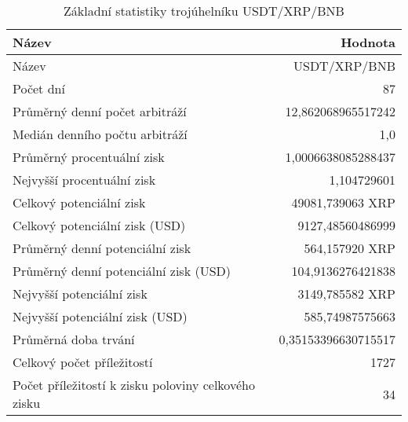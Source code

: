 \begin{table}\centering
\caption{Základní statistiky trojúhelníku USDT/XRP/BNB}
\label{USDTXRPBNB_stats}
\begin{tabular}{|| l | r ||}
\hline Název & Hodnota \\ 
\hline\hline Název & USDT/XRP/BNB \\ 
\hline Počet dní & 87 \\ 
\hline Průměrný denní počet arbitráží & 12,862068965517242 \\ 
\hline Medián denního počtu arbitráží & 1,0 \\ 
\hline Průměrný procentuální zisk & 1,0006638085288437 \\ 
\hline Nejvyšší procentuální zisk & 1,104729601 \\ 
\hline Celkový potenciální zisk & 49081,739063 XRP \\ 
\hline Celkový potenciální zisk (USD) & 9127,48560486999 \\ 
\hline Průměrný denní potenciální zisk & 564,157920 XRP \\ 
\hline Průměrný denní potenciální zisk (USD) & 104,9136276421838 \\ 
\hline Nejvyšší potenciální zisk & 3149,785582 XRP \\ 
\hline Nejvyšší potenciální zisk (USD) & 585,74987575663 \\ 
\hline Průměrná doba trvání & 0,35153396630715517 \\ 
\hline Celkový počet příležitostí & 1727 \\ 
\hline Počet příležitostí k zisku poloviny celkového zisku & 34 \\ 
\hline
\end{tabular}
\end{table}